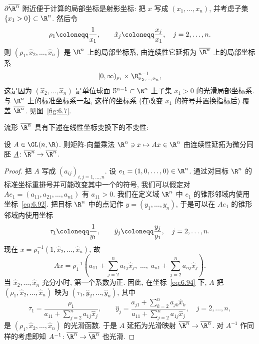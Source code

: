 $\partial\overline{\R^n}$ 附近便于计算的局部坐标是射影坐标: 把 $x$ 写成 $(x_1, \ldots, x_n)$, 并考虑子集 $\{x_1 > 0\} \subset \R^n$. 然后令
\begin{equation}\label{eq:6.92}
    \rho_1 \defeq \frac{1}{x_1}, \qquad \hat{x}_j \defeq \frac{x_j}{x_1}, \quad j = 2, \ldots, n.
\end{equation}
则 $(\rho_1, \hat{x}_2, \ldots, \hat{x}_n)$ 是 $\R^n$ 上的局部坐标系, 由连续性它延拓为 $\overline{\R^n}$ 上的局部坐标系
\begin{equation}\label{eq:6.93}
    [0, \infty)_{\rho_1} \times \R^{n-1}_{\hat{x}_2, \ldots, \hat{x}_n},
\end{equation}
这是因为 $(\hat{x}_2, \ldots, \hat{x}_n)$ 是单位球面 $\mathbb{S}^{n-1} \subset \R^n$ 上子集 $x_1 > 0$ 的光滑局部坐标系. 与 $\R^n$ 上的标准坐标系一起, 这样的坐标系 (在改变 $x_1$ 的符号并置换指标后) 覆盖 $\overline{\R^n}$. 见图~\ref{fig:6.7}.

流形 $\overline{\R^n}$ 具有下述在线性坐标变换下的不变性:

\begin{lemma}[可逆线性映射与径向紧化]\label{lem:6.50}
设 $A \in \GL(n, \R)$. 则矩阵-向量乘法 $\R^n \ni x \mapsto A x \in \R^n$ 由连续性延拓为微分同胚 $\underline{A} \colon \overline{\R^n} \to \overline{\R^n}$.
\end{lemma}

\begin{proof}
把 $A$ 写成 $(a_{ij})_{i, j = 1, \ldots, n}$. 设 $e_1 = (1, 0, \ldots, 0) \in \R^n$. 通过对目标 $\R^n$ 的标准坐标重排号并可能改变其中一个的符号, 我们可以假定对 $A e_1 = (a_{11}, a_{21}, \ldots, a_{n1})$ 有 $a_{11} > 0$. 我们在定义域 $\R^n$ 中 $e_1$ 的锥形邻域内使用坐标~\eqref{eq:6.92}. 把目标 $\R^n$ 中的点记作 $y = (y_1, \ldots, y_n)$, 于是可以在 $A e_1$ 的锥形邻域内使用坐标
\begin{equation}\label{eq:6.94}
    \tau_1 \defeq \frac{1}{y_1}, \qquad \hat{y}_j \defeq \frac{y_j}{y_1}, \quad j = 2, \ldots, n.
\end{equation}
现在 $x = \rho_1^{-1}(1, \hat{x}_2, \ldots, \hat{x}_n)$, 故
\begin{equation}\label{eq:6.95}
    A x = \rho_1^{-1} \left( a_{11} + \sum_{j=2}^n a_{1j}\hat{x}_j, \;\ldots,\; a_{n1} + \sum_{j=2}^n a_{nj}\hat{x}_j \right).
\end{equation}
当 $\hat{x}_2, \ldots, \hat{x}_n$ 充分小时, 第一个系数为正. 因此, 在坐标~\eqref{eq:6.94} 下, $A$ 把 $(\rho_1, \hat{x}_2, \ldots, \hat{x}_n)$ 映为 $(\tau_1, \hat{y}_2, \ldots, \hat{y}_n)$, 其中
\begin{equation}\label{eq:6.96}
    \tau_1 = \frac{\rho_1}{a_{11} + \sum_{j=2}^n a_{1j}\hat{x}_j}, \qquad \hat{y}_j = \frac{a_{j1} + \sum_{k=2}^n a_{jk}\hat{x}_k}{a_{11} + \sum_{j=2}^n a_{1j}\hat{x}_j}, \quad j = 2, \ldots, n,
\end{equation}
是 $(\rho_1, \hat{x}_2, \ldots, \hat{x}_n)$ 的光滑函数. 于是 $A$ 延拓为光滑映射 $\overline{\R^n} \to \overline{\R^n}$. 对 $A^{-1}$ 作同样的考虑即知 $A^{-1} \colon \overline{\R^n} \to \overline{\R^n}$ 也光滑.
\end{proof}

